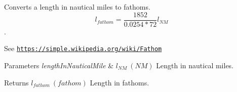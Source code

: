 Converts a length in nautical miles to fathoms. \[ l_{fathom}= \frac{1852}{0.0254 * 72} l_{NM} \]. 

See \href{https://simple.wikipedia.org/wiki/Fathom}{\tt https\+://simple.\+wikipedia.\+org/wiki/\+Fathom} 
\begin{DoxyParams}{Parameters}
{\em length\+In\+Nautical\+Mile} & $ l_{NM}\ (NM)$ Length in nautical miles. \\
\hline
\end{DoxyParams}
\begin{DoxyReturn}{Returns}
$ l_{fathom}\ (fathom)$ Length in fathoms. 
\end{DoxyReturn}
